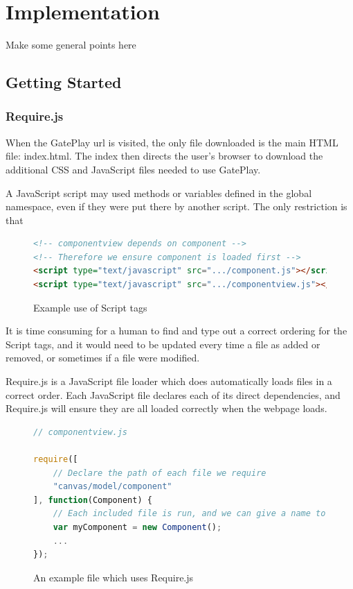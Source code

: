 \chapter{Implementation}
Make some general points here

\section{Getting Started}

\subsection{Require.js}
When the GatePlay url is visited, the only file downloaded is the main HTML file: index.html. The index then directs the user's browser to download the additional CSS and JavaScript files needed to use GatePlay.

A JavaScript script may used methods or variables defined in the global namespace, even if they were put there by another script. The only restriction is that

\begin{figure}[H]
\begin{lstlisting}[language=html]
<!-- componentview depends on component -->
<!-- Therefore we ensure component is loaded first -->
<script type="text/javascript" src=".../component.js"></script>
<script type="text/javascript" src=".../componentview.js"></script>
\end{lstlisting}
\caption{Example use of Script tags}
\end{figure}

It is time consuming for a human to find and type out a correct ordering for the Script tags, and it would need to be updated every time a file as added or removed, or sometimes if a file were modified.

Require.js is a JavaScript file loader which does automatically loads files in a correct order. Each JavaScript file declares each of its direct dependencies, and Require.js will ensure they are all loaded correctly when the webpage loads.

\begin{figure}[H]
\begin{lstlisting}[language=JavaScript]
// componentview.js

require([
	// Declare the path of each file we require	
	"canvas/model/component"
], function(Component) {
	// Each included file is run, and we can give a name to whatever it returns if desired
	var myComponent = new Component();
	...
});
\end{lstlisting}
\caption{An example file which uses Require.js}
\end{figure}

